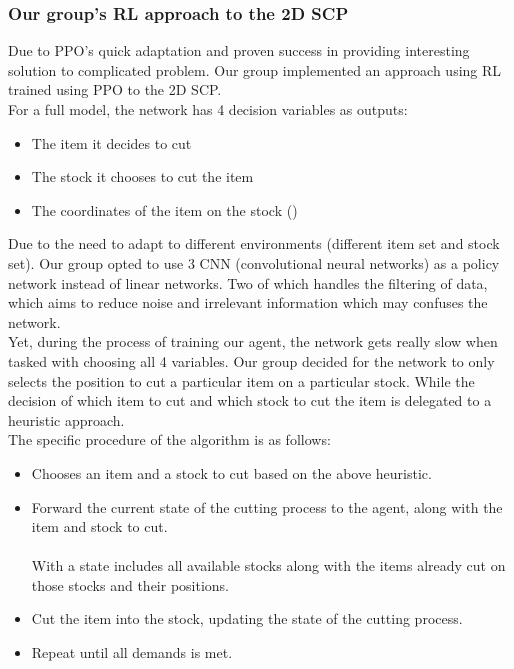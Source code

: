 \documentclass[a4paper]{article}
\begin{document}
    \subsubsection{Our group's RL approach to the 2D SCP}
    Due to PPO's quick adaptation and proven success in providing interesting solution to complicated problem. Our group implemented an approach using RL trained using PPO to the 2D SCP.
    \vspace{0.2cm}\\
    For a full model, the network has 4 decision variables as outputs:
    \begin{itemize}
        \item The item it decides to cut
        \item The stock it chooses to cut the item
        \item The coordinates of the item on the stock (\boldmath{$[x, y]$})
    \end{itemize}  
    \vspace{0.2cm}
    Due to the need to adapt to different environments (different item set and stock set). Our group opted to use 3 CNN (convolutional neural networks) as a policy network instead of linear networks. Two of which handles the filtering of data, which aims to reduce noise and irrelevant information which may confuses the network.
    \vspace{0.2cm}\\
    Yet, during the process of training our agent, the network gets really slow when tasked with choosing all 4 variables. Our group decided for the network to only selects the position to cut a particular item on a particular stock. While the decision of which item to cut and which stock to cut the item is delegated to a heuristic approach.
    \vspace{0.2cm}\\
    The specific procedure of the algorithm is as follows:
    \begin{itemize}
        \item Chooses an item and a stock to cut based on the above heuristic.
        \item Forward the current state of the cutting process to the agent, along with the item and stock to cut. 
            \\ \\
            With a state includes all available stocks along with the items already cut on those stocks and their positions.
        \item Cut the item into the stock, updating the state of the cutting process.
        \item Repeat until all demands is met.
    \end{itemize}
\end{document}
